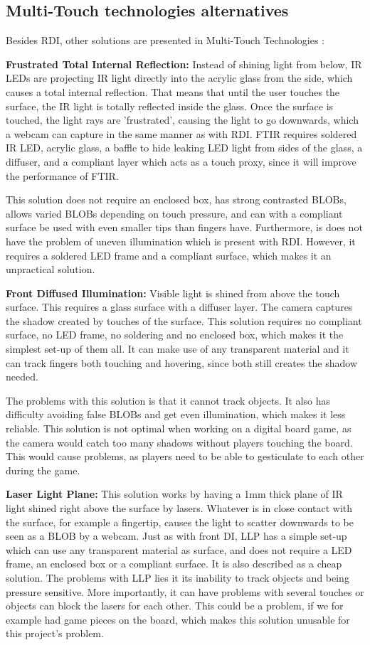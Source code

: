 \subsection{Multi-Touch technologies alternatives}\label{technologiesAlternatives}
Besides RDI, other solutions are presented in Multi-Touch Technologies \citep{multiTT}:

\textbf{Frustrated Total Internal Reflection:} Instead of shining light from below, IR LEDs are projecting IR light directly into the acrylic glass from the side, which causes a total internal reflection. That means that until the user touches the surface, the IR light is totally reflected inside the glass. Once the surface is touched, the light rays are 'frustrated', causing the light to go downwards, which a webcam can capture in the same manner as with RDI. FTIR requires soldered IR LED, acrylic glass, a baffle to hide leaking LED light from sides of the glass, a diffuser, and a compliant layer which acts as a touch proxy, since it will improve the performance of FTIR.

This solution does not require an enclosed box, has strong contrasted BLOBs, allows varied BLOBs depending on touch pressure, and can with a compliant surface be used with even smaller tips than fingers have. Furthermore, is does not have the problem of uneven illumination which is present with RDI. However, it requires a soldered LED frame and a compliant surface, which makes it an unpractical solution.

\textbf{Front Diffused Illumination:} Visible light is shined from above the touch surface. This requires a glass surface with a diffuser layer. The camera captures the shadow created by touches of the surface. This solution requires no compliant surface, no LED frame, no soldering and no enclosed box, which makes it the simplest set-up of them all. It can make use of any transparent material and it can track fingers both touching and hovering, since both still creates the shadow needed.

The problems with this solution is that  it cannot track objects. It also has difficulty avoiding false BLOBs and get even illumination, which makes it less reliable. This solution is not optimal when working on a digital board game, as the camera would catch too many shadows without players touching the board. This would cause problems, as players need to be able to gesticulate to each other during the game.

\textbf{Laser Light Plane:} This solution works by having a 1mm thick plane of IR light shined right above the surface by lasers. Whatever is in close contact with the surface, for example a fingertip, causes the light to scatter downwards to be seen as a BLOB by a webcam. Just as with front DI, LLP has a simple set-up which can use any transparent material as surface, and does not require a LED frame, an enclosed box or a compliant surface. It is also described as a cheap solution. The problems with LLP lies it its inability to track objects and being pressure sensitive. More importantly, it can have problems with several touches or objects can block the lasers for each other. This could be a problem, if we for example had game pieces on the board, which makes this solution unusable for this project's problem. 

